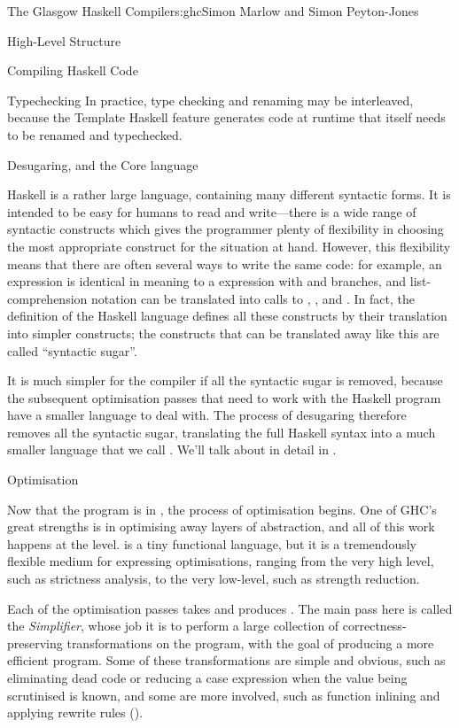 \begin{aosachapter}{The Glasgow Haskell Compiler}{s:ghc}{Simon Marlow and Simon Peyton-Jones}
\begin{aosasect1}{High-Level Structure}
\begin{aosasect2}{Compiling Haskell Code}
\begin{aosasect3}{Typechecking}
In practice, type checking and renaming may be interleaved, because
the Template Haskell feature generates code at runtime that itself
needs to be renamed and typechecked.

\end{aosasect3}

\begin{aosasect3}{Desugaring, and the Core language}

Haskell is a rather large language, containing many different
syntactic forms.  It is intended to be easy for humans to read and
write---there is a wide range of syntactic constructs which gives the
programmer plenty of flexibility in choosing the most appropriate
construct for the situation at hand.  However, this flexibility means
that there are often several ways to write the same code: for example,
an  expression is identical in meaning to a 
expression with  and  branches, and
list-comprehension notation can be translated into calls to
, , and .  In fact, the definition
of the Haskell language defines all these constructs by their
translation into simpler constructs; the constructs that can be
translated away like this are called ``syntactic sugar''.

It is much simpler for the compiler if all the syntactic sugar is
removed, because the subsequent optimisation passes that need to work
with the Haskell program have a smaller language to deal with.  The
process of desugaring therefore removes all the syntactic sugar,
translating the full Haskell syntax into a much smaller language that
we call \Core{}.  We'll talk about \Core{} in detail in .

\end{aosasect3}

\begin{aosasect3}{Optimisation}

Now that the program is in \Core{}, the process of optimisation
begins.  One of GHC's great strengths is in optimising away layers of
abstraction, and all of this work happens at the \Core{} level.
\Core{} is a tiny functional language, but it is a tremendously
flexible medium for expressing optimisations, ranging from the very
high level, such as strictness analysis, to the very low-level, such
as strength reduction.

Each of the optimisation passes takes \Core{} and produces
\Core{}.  The main pass here is called the \emph{Simplifier}, whose job
it is to perform a large collection of correctness-preserving
transformations on the program, with the goal of producing a more
efficient program.  Some of these transformations are simple and
obvious, such as eliminating dead code or reducing a case expression
when the value being scrutinised is known, and some are more involved,
such as function inlining and applying rewrite rules ().


\end{aosasect3}
\end{aosasect2}
\end{aosasect1}
\end{aosachapter}
